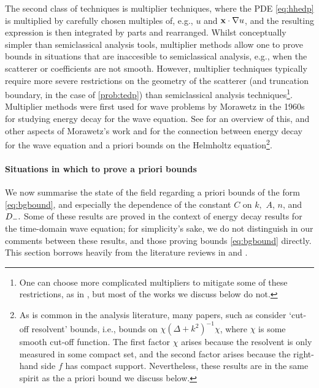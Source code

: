 The second class of techniques is multiplier techniques, where the PDE \eqref{eq:hhedp} is multiplied by carefully chosen multiples of, e.g.,  $u$ and $\mathbf{x}\cdot\nabla u$, and the resulting expression is then integrated by parts and rearranged. Whilst conceptually simpler than semiclassical analysis tools, multiplier methods allow one to prove bounds in situations that are inaccesible to semiclassical analysis, e.g., when the scatterer or coefficients are not smooth. However, multiplier techniques typically require more severe restrictions on the geometry of the scatterer (and truncation boundary, in the case of \cref{prob:tedp}) than semiclassical analysis techniques\footnote{One can choose more complicated multipliers to mitigate some of these restrictions, as in \cite{MoRaSt:77}, but most of the works we discuss below do not.}. Multiplier methods were first used for wave problems by Morawetz in the 1960s for studying  energy decay for the wave equation. See \cite{GaGrPaSaSoTa:18} for an overview of this, and other aspects of Morawetz's work and \cite[Theorem 1.1]{Vo:99} for the connection between energy decay for the wave equation and a priori bounds on the Helmholtz equation\footnote{As is common in the analysis literature, many papers, such as \cite{Vo:99} consider `cut-off resolvent' bounds, i.e., bounds on $\chi(\Delta + k^2)^{-1}\chi$, where $\chi$ is some smooth cut-off function. The first factor $\chi$ arises because the resolvent is only measured in some compact set, and the second factor arises because the right-hand side $f$ has compact support. Nevertheless, these results are in the same spirit as the a priori bound we discuss below.}. 

\paragraph{Situations in which to prove a priori bounds} We now summarise the state of the field regarding a priori bounds of the form \eqref{eq:bgbound}, and especially the dependence of the constant $C$ on $k,$ $A$, $n$, and $D_{-}.$ Some of these results are proved in the context of energy decay results for the time-domain wave equation; for simplicity's sake, we do not distinguish in our comments between these results, and those proving bounds \eqref{eq:bgbound} directly. This section borrows heavily from the literature reviews in \cite[Section 1.1]{ChSpGiSm:17} and \cite[Sections 1 and 2.4]{GrPeSp:19}.

